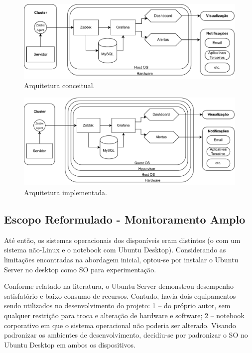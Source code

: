 \begin{figure}[H]
\centering
\setlength{\abovecaptionskip}{-20pt}
\includegraphics[width=\textwidth]{Imagens/chap03/v0_diagram.pdf}
\caption{Arquitetura conceitual.}
\label{fig:ArquiteturaConceitual}
\end{figure}

\begin{figure}[H]
\centering
\setlength{\abovecaptionskip}{-20pt}
\includegraphics[width=\textwidth]{Imagens/chap03/v1_diagram.pdf}
\caption{Arquitetura implementada.}
\label{fig:ArquiteturaImplementada}
\end{figure}

\subsection{Escopo Reformulado - Monitoramento Amplo}
\label{subsection:EscopoReformulado}

Até então, os sistemas operacionais dos  disponíveis eram distintos (o  com um sistema não-Linux e o notebook com Ubuntu Desktop). Considerando as limitações encontradas na abordagem inicial, optou-se por instalar o Ubuntu Server no desktop como SO para experimentação.

Conforme relatado na literatura, o Ubuntu Server demonstrou desempenho satisfatório e baixo consumo de recursos. Contudo, havia dois equipamentos sendo utilizados no desenvolvimento do projeto: 1 --  do próprio autor, sem qualquer restrição para troca e alteração de hardware e software; 2 -- notebook corporativo em que o sistema operacional não poderia ser alterado. Visando padronizar os ambientes de desenvolvimento, decidiu-se por padronizar o SO no Ubuntu Desktop em ambos os dispositivos.

